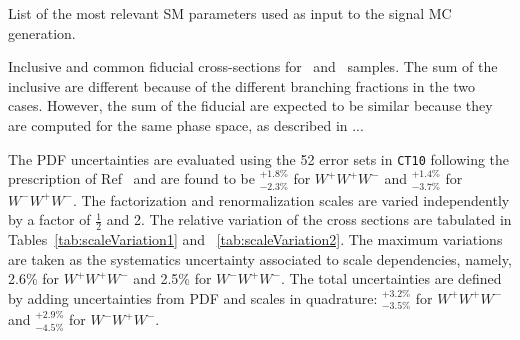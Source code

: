\begin{table}[ht]
\centering

\caption{List of the most relevant SM parameters used as input to the 
signal MC generation.}
\label{tab:signal_sm_parameters}
\end{table}


\begin{table}[ht]
\centering

\caption{Inclusive and common fiducial cross-sections for \vbfnlo~and 
\madgraph~samples. The sum of the inclusive \xsecs are different
because of the different branching fractions in the two cases. However,
the sum of the fiducial \xsecs are expected to be similar because
they are computed for the same phase space, as described in \sec...}
\label{tab:signal_xsec}
\end{table}







The PDF uncertainties are evaluated using the 52 error sets in
\texttt{CT10} following the prescription of Ref~\cite{Lai:2010vv} and
are found to be $^{+1.8\%}_{-2.3\%}$ for $W^+W^+W^-$ and
$^{+1.4\%}_{-3.7\%}$ for $W^-W^+W^-$.  The factorization and
renormalization scales are varied independently by a factor of
$\frac{1}{2}$ and 2. The relative variation of the cross sections are
tabulated in Tables~\ref{tab:scaleVariation1} and
~\ref{tab:scaleVariation2}. The maximum variations are taken as the
systematics uncertainty associated to scale dependencies, namely, 2.6\%
for $W^+W^+W^-$ and 2.5\% for $W^-W^+W^-$. The total uncertainties are
defined by adding uncertainties from PDF and scales in quadrature:
$^{+3.2\%}_{-3.5\%}$ for $W^+W^+W^-$ and $^{+2.9\%}_{-4.5\%}$ for
$W^-W^+W^-$.

